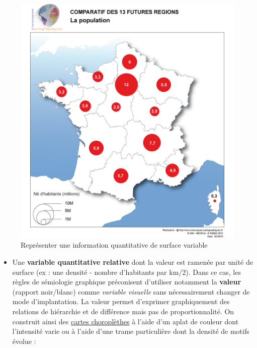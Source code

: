 \begin{figure}[htbp]
\centering
\includegraphics{figures/example_proportion.jpg}
\caption{Représenter une information quantitative de surface variable}
\end{figure}

\begin{itemize}
\tightlist
\item
  Une \textbf{variable quantitative relative} dont la valeur est ramenée
  par unité de surface (ex : une densité - nombre d'habitants par km/2).
  Dans ce cas, les règles de sémiologie graphique préconisent d'utiliser
  notamment la \textbf{valeur} (rapport noir/blanc) comme \emph{variable
  visuelle} sans nécessairement changer de mode d'implantation. La
  valeur permet d'exprimer graphiquement des relations de hiérarchie et
  de différence mais pas de proportionnalité. On construit ainsi des
  \href{https://fr.wikipedia.org/wiki/Carte_choropl\%C3\%A8the}{cartes
  choroplèthes} à l'aide d'un aplat de couleur dont l'intensité varie ou
  à l'aide d'une trame particulière dont la densité de motifs évolue :
\end{itemize}

